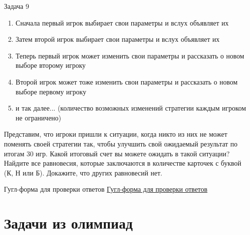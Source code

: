 \begin{mybox}{Задача 9}
\begin{enumerate}
        \item Сначала первый игрок выбирает свои параметры и вслух объявляет их
        \item Затем второй игрок выбирает свои параметры и вслух объявляет их
        \item Теперь первый игрок может изменить свои параметры и рассказать о новом выборе второму игроку
        \item Второй игрок может тоже изменить свои параметры и рассказать о новом выборе первому игроку
        \item и так далее... (количество возможных изменений стратегии каждым игроком не ограничено)
    \end{enumerate}
    Представим, что игроки пришли к ситуации, когда никто из них не может поменять своей стратегии так, чтобы улучшить свой ожидаемый результат по итогам 30 игр. Какой итоговый счет вы можете ожидать в такой ситуации? Найдите все равновесия, которые заключаются в количестве карточек с буквой (К, Н или Б). Докажите, что других равновесий нет.
\end{mybox}

\begin{mybox}{Гугл-форма для проверки ответов}
    \href{https://forms.gle/1FkPGARXqSBnACzs8}{Гугл-форма для проверки ответов}
\end{mybox}


\section{Задачи из олимпиад}

